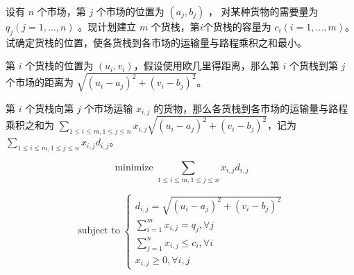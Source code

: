 

\newcommand\Title{最优化方法第1次作业}






\begin{problem}
  设有 $n$ 个市场，第 $j$ 个市场的位置为 $(a_j, b_j)$ ， 对某种货物的需要量为 $q_j(j=1,\dots,n)$ 。现计划建立 $m$ 个货栈，第$i$个货栈的容量为 $c_i(i=1, \dots, m)$。试确定货栈的位置，使各货栈到各市场的运输量与路程乘积之和最小。
\end{problem}


\begin{solution}

第 $i$ 个货栈的位置为 $(u_i, v_i)$，假设使用欧几里得距离，那么第 $i$ 个货栈到第 $j$ 个市场的距离为 $\sqrt{(u_i-a_j)^2+(v_i-b_j)^2}$。

第 $i$ 个货栈向第 $j$ 个市场运输 $x_{i,j}$ 的货物，那么各货栈到各市场的运输量与路程乘积之和为 $\sum_{1\le i \le m, 1\le j \le n}x_{i,j}\sqrt{(u_i-a_j)^2+(v_i-b_j)^2}$，记为$\sum_{1\le i \le m, 1\le j \le n}x_{i,j}d_{i,j}$。

$$\operatorname{minimize} \sum_{1\le i \le m, 1\le j \le n}x_{i,j}d_{i,j}$$

$$\operatorname{subject \ to}\left\{\begin{matrix} 
  d_{i,j}=\sqrt{(u_i-a_j)^2+(v_i-b_j)^2}\\
  \sum_{i=1}^m x_{i,j}=q_j, \forall j\\  
  \sum_{j=1}^n x_{i,j}\le c_i, \forall i\\
  x_{i,j}\ge 0, \forall i,j
\end{matrix}\right. $$

\end{solution}
  
